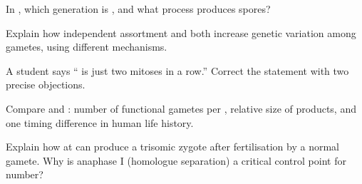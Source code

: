 \begin{exercise}[$\star\star$]\label{exo:g11:meiosis-life-cycles:8}
In , which generation is , and what process
produces spores?
\end{exercise}

\begin{exercise}[$\star\star\star$]\label{exo:g11:meiosis-life-cycles:9}
Explain how independent assortment and  both increase genetic
variation among gametes, using different mechanisms.
\end{exercise}

\begin{exercise}[$\star\star\star$]\label{exo:g11:meiosis-life-cycles:10}
A student says `` is just two mitoses in a row.'' Correct the statement
with two precise objections.
\end{exercise}

\begin{exercise}[$\star\star$]\label{exo:g11:meiosis-life-cycles:11}
Compare  and : number of functional gametes per
, relative size of products, and one timing difference in human
life history.
\end{exercise}

\begin{exercise}[$\star\star\star$]\label{exo:g11:meiosis-life-cycles:12}
Explain how  at  can produce a trisomic zygote after
fertilisation by a normal gamete. Why is anaphase I (homologue separation)
a critical control point for  number?
\end{exercise}

